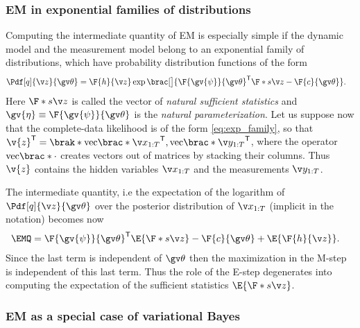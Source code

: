  

\subsubsection*{EM in exponential families of distributions}\label{sec:EM_exp}%

Computing the intermediate quantity of EM is especially simple
if the dynamic model and the measurement model belong to an exponential
family of distributions, which have probability distribution functions of the form 
\begin{align}
	\Pdf[q]{\z}{\Th}&=\F{h}{\z}\exp\brac[\big]{ \F{\gv{\psi}}{\Th}^\tr \F*{s}{\z}-\F{c}{\Th}}.
	\label{eq:exp_family}
\end{align}
Here $\F*{s}{\z}$ is called the vector of \emph{natural sufficient statistics} and
$\gv{\eta}\equiv \F{\gv{\psi}}{\Th}$ is the \emph{natural parameterization}.
Let us suppose now that the complete-data likelihood is of the form \eqref{eq:exp_family}, so
that $\v{z}^\tr=\brak*{\mathrm{vec}\brac*{\X}^\tr,\mathrm{vec}\brac*{\Y}^\tr}$, where the operator $\mathrm{vec}\brac*{\cdot}$
creates vectors out of matrices by stacking their columns. Thus $\v{z}$ 
contains the hidden variables $\X$ and the measurements $\Y$. 

The intermediate quantity, i.e the expectation of the logarithm of $\Pdf[q]{\z}{\Th}$ over the posterior distribution of 
$\X$ (implicit in the notation) becomes now
\begin{align}
	\EMQ&=	\F{\gv{\psi}}{\Th}^\tr \E{\F*{s}{\z}}-\F{c}{\Th}+\E{\F{h}{\z}}.
\end{align}
Since the last term is independent of $\Th$ then the maximization in the M-step
is independent of this last term. Thus the role of the E-step degenerates into computing the
expectation of the sufficient statistics $\E{\F*{s}{\z}}$.



\subsubsection*{EM as a special case of variational Bayes}%


